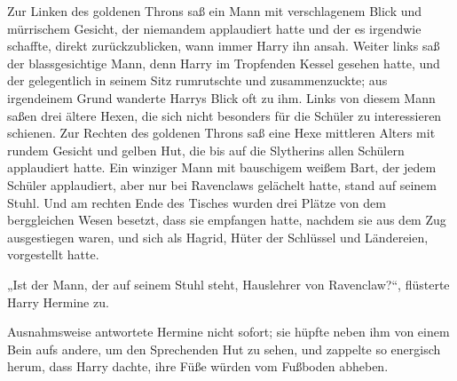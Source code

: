 Zur Linken des goldenen Throns saß ein Mann mit verschlagenem Blick und mürrischem Gesicht, der niemandem applaudiert hatte und der es irgendwie schaffte, direkt zurückzublicken, wann immer Harry ihn ansah. Weiter links saß der blassgesichtige Mann, denn Harry im Tropfenden Kessel gesehen hatte, und der gelegentlich in seinem Sitz rumrutschte und zusammenzuckte; aus irgendeinem Grund wanderte Harrys Blick oft zu ihm. Links von diesem Mann saßen drei ältere Hexen, die sich nicht besonders für die Schüler zu interessieren schienen. Zur Rechten des goldenen Throns saß eine Hexe mittleren Alters mit rundem Gesicht und gelben Hut, die bis auf die Slytherins allen Schülern applaudiert hatte. Ein winziger Mann mit bauschigem weißem Bart, der jedem Schüler applaudiert, aber nur bei Ravenclaws gelächelt hatte, stand auf seinem Stuhl. Und am rechten Ende des Tisches wurden drei Plätze von dem berggleichen Wesen besetzt, dass sie empfangen hatte, nachdem sie aus dem Zug ausgestiegen waren, und sich als Hagrid, Hüter der Schlüssel und Ländereien, vorgestellt hatte.

„Ist der Mann, der auf seinem Stuhl steht, Hauslehrer von Ravenclaw?“, flüsterte Harry Hermine zu.

Ausnahmsweise antwortete Hermine nicht sofort; sie hüpfte neben ihm von einem Bein aufs andere, um den Sprechenden Hut zu sehen, und zappelte so energisch herum, dass Harry dachte, ihre Füße würden vom Fußboden abheben.


